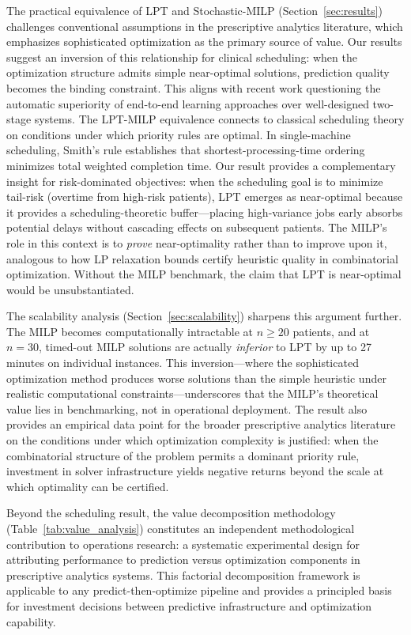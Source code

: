 \documentclass[11pt,a4paper]{article}
\begin{document}
The practical equivalence of LPT and Stochastic-MILP (Section~\ref{sec:results}) challenges conventional assumptions in the prescriptive analytics literature, which emphasizes sophisticated optimization as the primary source of value. Our results suggest an inversion of this relationship for clinical scheduling: when the optimization structure admits simple near-optimal solutions, prediction quality becomes the binding constraint. This aligns with recent work questioning the automatic superiority of end-to-end learning approaches over well-designed two-stage systems. The LPT-MILP equivalence connects to classical scheduling theory on conditions under which priority rules are optimal. In single-machine scheduling, Smith's rule establishes that shortest-processing-time ordering minimizes total weighted completion time. Our result provides a complementary insight for risk-dominated objectives: when the scheduling goal is to minimize tail-risk (overtime from high-risk patients), LPT emerges as near-optimal because it provides a scheduling-theoretic buffer---placing high-variance jobs early absorbs potential delays without cascading effects on subsequent patients. The MILP's role in this context is to \textit{prove} near-optimality rather than to improve upon it, analogous to how LP relaxation bounds certify heuristic quality in combinatorial optimization. Without the MILP benchmark, the claim that LPT is near-optimal would be unsubstantiated.

The scalability analysis (Section~\ref{sec:scalability}) sharpens this argument further. The MILP becomes computationally intractable at $n \geq 20$ patients, and at $n = 30$, timed-out MILP solutions are actually \textit{inferior} to LPT by up to 27 minutes on individual instances. This inversion---where the sophisticated optimization method produces worse solutions than the simple heuristic under realistic computational constraints---underscores that the MILP's theoretical value lies in benchmarking, not in operational deployment. The result also provides an empirical data point for the broader prescriptive analytics literature on the conditions under which optimization complexity is justified: when the combinatorial structure of the problem permits a dominant priority rule, investment in solver infrastructure yields negative returns beyond the scale at which optimality can be certified.

Beyond the scheduling result, the value decomposition methodology (Table~\ref{tab:value_analysis}) constitutes an independent methodological contribution to operations research: a systematic experimental design for attributing performance to prediction versus optimization components in prescriptive analytics systems. This factorial decomposition framework is applicable to any predict-then-optimize pipeline and provides a principled basis for investment decisions between predictive infrastructure and optimization capability.
\end{document}
